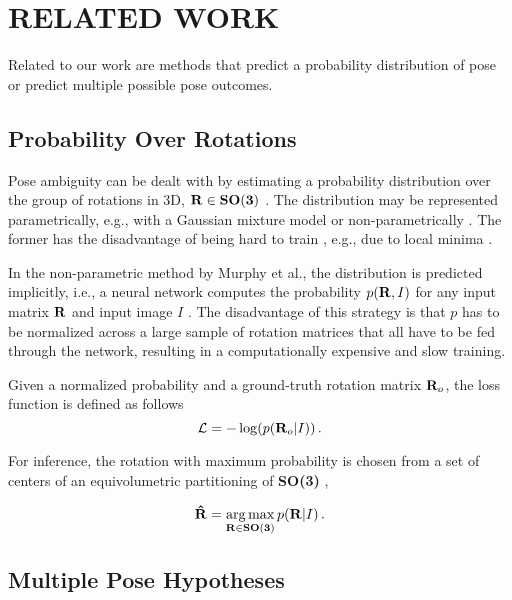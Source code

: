 \section{RELATED WORK}
Related to our work are methods that predict a probability distribution of pose or predict multiple possible pose outcomes.

\subsection{Probability Over Rotations}

Pose ambiguity can be dealt with by estimating a probability distribution over the group of rotations in 3D, ${\bf R} \in {\bf SO(3)}$ \cite{gilitschenski2019,murphy2021}. The distribution may be represented parametrically, e.g., with a Gaussian mixture model \cite{gilitschenski2019} or non-parametrically \cite{murphy2021}. The former has the disadvantage of being hard to train \cite{gilitschenski2019}, e.g., due to local minima \cite{Hoffmann2005}.

In the non-parametric method by Murphy et al.,  the distribution is predicted implicitly, i.e., a neural network computes the probability $p({\bf R}, I)$ for any input matrix ${\bf R}$ and input image $I$ \cite{murphy2021}. The disadvantage of this strategy is that $p$ has to be normalized across a large sample of rotation matrices that all have to be fed through the network, resulting in a computationally expensive and slow training.

Given a normalized probability and a ground-truth rotation matrix ${\bf R}_o$, the loss function is defined as follows  \cite{murphy2021}
%
\begin{equation}\label{eq:prob_loss}
\mathcal{L} = - \log(p({\bf R}_o | I))\,.
\end{equation}
%

For inference, the rotation with maximum probability is chosen from a set of centers of an equivolumetric partitioning of {\bf SO(3)} \cite{murphy2021},

\begin{equation}\label{eq:prob_inf}
{\bf \hat R} = \underset{{\bf R} \in {\bf SO(3)}}{\arg \max}\, p({\bf R} | I)\,.
\end{equation}

\subsection{Multiple Pose Hypotheses}

